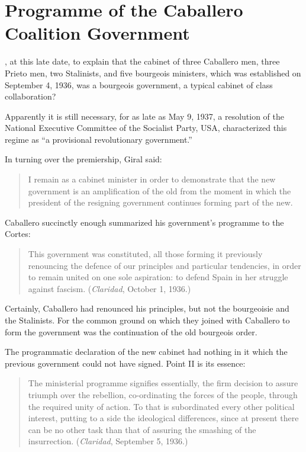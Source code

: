 \chapter{Programme of the Caballero Coalition Government}

, at this late date, to explain that the cabinet of three Caballero men, three Prieto men, two Stalinists, and five bourgeois ministers, which was established on September 4, 1936, was a bourgeois government, a typical cabinet of class collaboration?

Apparently it is still necessary, for as late as May 9, 1937, a resolution of the National Executive Committee of the Socialist Party, USA, characterized this regime as ``a provisional revolutionary government.''

In turning over the premiership, Giral said:

\begin{quotation}
  I remain as a cabinet minister in order to demonstrate that the new government is an amplification of the old from the moment in which the president of the resigning government continues forming part of the new.
\end{quotation}

Caballero succinctly enough summarized his government’s programme to the Cortes:

\begin{quotation}
  This government was constituted, all those forming it previously renouncing the defence of our principles and particular tendencies, in order to remain united on one sole aspiration: to defend Spain in her struggle against fascism. (\emph{Claridad}, October 1, 1936.)
\end{quotation}

Certainly, Caballero had renounced his principles, but not the bourgeoisie and the Stalinists. For the common ground on which they joined with Caballero to form the government was the continuation of the old bourgeois order.

The programmatic declaration of the new cabinet had nothing in it which the previous government could not have signed. Point II is its essence:

\begin{quotation}
  The ministerial programme signifies essentially, the firm decision to assure triumph over the rebellion, co-ordinating the forces of the people, through the required unity of action. To that is subordinated every other political interest, putting to a side the ideological differences, since at present there can be no other task than that of assuring the smashing of the insurrection. (\emph{Claridad}, September 5, 1936.)
\end{quotation}

